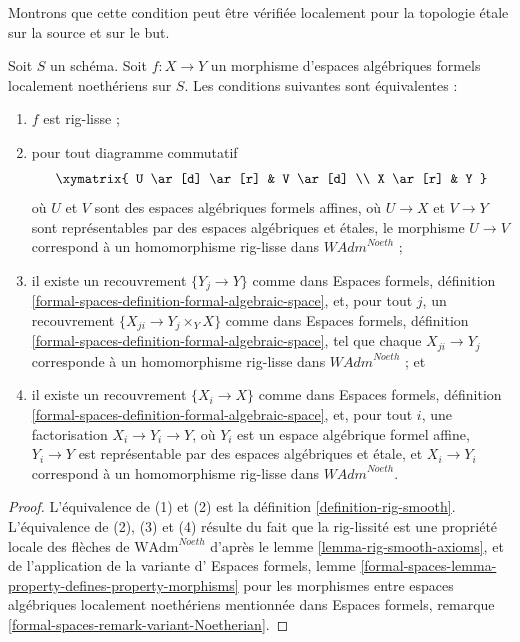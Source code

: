 \noindent
Montrons que cette condition peut être vérifiée localement pour la topologie
étale sur la source et sur le but.

\begin{lemma}
\label{lemma-rig-smooth-morphisms}
Soit $S$ un schéma. Soit $f : X \to Y$ un morphisme d'espaces
algébriques formels localement noethériens sur $S$.
Les conditions suivantes sont équivalentes :
\begin{enumerate}
\item $f$ est rig-lisse ;
\item pour tout diagramme commutatif
$$
\xymatrix{
U \ar[d] \ar[r] & V \ar[d] \\
X \ar[r] & Y
}
$$
où $U$ et $V$ sont des espaces algébriques formels affines, où $U \to X$ et $V \to Y$
sont représentables par des espaces algébriques et étales, le morphisme $U \to V$
correspond à un homomorphisme rig-lisse dans $\textit{WAdm}^{Noeth}$ ;
\item il existe un recouvrement $\{Y_j \to Y\}$ comme dans
Espaces formels,
définition \ref{formal-spaces-definition-formal-algebraic-space},
et, pour tout $j$,
un recouvrement $\{X_{ji} \to Y_j \times_Y X\}$ comme dans
Espaces formels,
définition \ref{formal-spaces-definition-formal-algebraic-space},
tel que chaque $X_{ji} \to Y_j$ corresponde
à un homomorphisme rig-lisse dans $\textit{WAdm}^{Noeth}$ ; et
\item il existe un recouvrement $\{X_i \to X\}$ comme dans
Espaces formels,
définition \ref{formal-spaces-definition-formal-algebraic-space},
et, pour tout $i$, une factorisation $X_i \to Y_i \to Y$, où $Y_i$
est un espace algébrique formel affine, $Y_i \to Y$ est représentable
par des espaces algébriques et étale, et $X_i \to Y_i$ correspond
à un homomorphisme rig-lisse dans $\textit{WAdm}^{Noeth}$.
\end{enumerate}
\end{lemma}

\begin{proof}
L'équivalence de (1) et (2) est la définition \ref{definition-rig-smooth}.
L'équivalence de (2), (3) et (4) résulte du fait que
la rig-lissité est une propriété locale des flèches de
$\text{WAdm}^{Noeth}$ d'après le lemme \ref{lemma-rig-smooth-axioms},
et de l'application de la variante d'
Espaces formels, lemme
\ref{formal-spaces-lemma-property-defines-property-morphisms}
pour les morphismes entre espaces algébriques localement noethériens
mentionnée dans
Espaces formels, remarque
\ref{formal-spaces-remark-variant-Noetherian}.
\end{proof}

